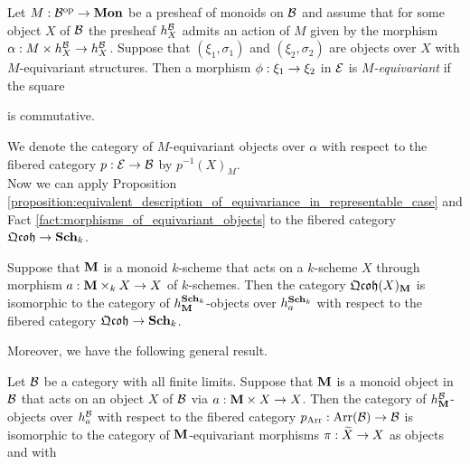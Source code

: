 \begin{definition}
Let $M:{\mathcal B}^{\mathrm{op}}\rightarrow \mathbf{Mon}$ be a presheaf of monoids on ${\mathcal B}$ and assume that for some object $X$ of ${\mathcal B}$ the presheaf $h^{{\mathcal B}}_X$ admits an action of $M$ given by the morphism $\alpha:M\times h^{{\mathcal B}}_X\rightarrow h^{{\mathcal B}}_X$. Suppose that $(\xi_1,\sigma_1)$ and $(\xi_2,\sigma_2)$ are objects over $X$ with $M$-equivariant structures. Then a morphism $\phi:\xi_1\rightarrow \xi_2$ in ${\mathcal E}$ is \textit{$M$-equivariant} if the square
\begin{center}
\end{center}
is commutative.
\end{definition}
\noindent
We denote the category of $M$-equivariant objects over $\alpha$ with respect to the fibered category $p:{\mathcal E}\rightarrow {\mathcal B}$ by $p^{-1}(X)_{M}$.\\
Now we can apply Proposition \ref{proposition:equivalent_description_of_equivariance_in_representable_case} and Fact \ref{fact:morphisms_of_equivariant_objects} to the fibered category $\mathfrak{Qcoh}\rightarrow \mathbf{Sch}_k$.

\begin{corollary}\label{corollary:isomorphism_between_equivariant_quasi_coherent_sheaves_and_equivariant_objects_in_fibered_category_of_quasi_coherent_sheaves}
Suppose that $\mathbf{M}$ is a monoid $k$-scheme that acts on a $k$-scheme $X$ through morphism $a:\mathbf{M}\times_k X\rightarrow X$ of $k$-schemes. Then the category $\mathfrak{Qcoh}(X)_{\mathbf{M}}$ is isomorphic to the category of $h^{\mathbf{Sch}_k}_{\mathbf{M}}$-objects over $h^{\mathbf{Sch}_k}_a$ with respect to the fibered category $\mathfrak{Qcoh}\rightarrow \mathbf{Sch}_k$.
\end{corollary}
\noindent
Moreover, we have the following general result.

\begin{corollary}\label{corollary:isomorphism_between_equivariant_objects_and_objects_with_action}
Let ${\mathcal B}$ be a category with all finite limits. Suppose that $\mathbf{M}$ is a monoid object in ${\mathcal B}$ that acts on an object $X$ of ${\mathcal B}$ via $a:\mathbf{M}\times X\rightarrow X$. Then the category of $h^{{\mathcal B}}_{\mathbf{M}}$-objects over $h^{{\mathcal B}}_a$ with respect to the fibered category $p_{\mathrm{Arr}}:\mathrm{Arr}({\mathcal B})\rightarrow {\mathcal B}$ is isomorphic to the category of $\mathbf{M}$-equivariant morphisms $\pi:\widetilde{X}\rightarrow X$ as objects and with 
\end{corollary}

